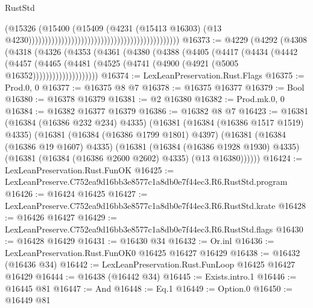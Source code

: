 \begin{lexlean}{RustStd}
\begin{coremodule}
                                                                                      (@15326
                                                                                        (@15400
                                                                                          (@15409
                                                                                            (@4231
                                                                                              (@15413
                                                                                                @16303)
                                                                                              (@13
                                                                                                @4230))))))))))))))))))))))))))))))))))))))))))))))
@16373 := @4229
    (@4292
      (@4308
        (@4318
          (@4326
            (@4353
              (@4361
                (@4380
                  (@4388
                    (@4405
                      (@4417
                        (@4434
                          (@4442
                            (@4457
                              (@4465
                                (@4481 (@4525 (@4741 (@4900 (@4921 (@5005 @16352))))))))))))))))))))
@16374 := LexLeanPreservation.Rust.Flags
@16375 := Prod.{0, 0}
@16377 := @16375 @8 @7
@16378 := @16375 @16377
@16379 := Bool
@16380 := @16378 @16379
@16381 := @2 @16380
@16382 := Prod.mk.{0, 0}
@16384 := @16382 @16377 @16379
@16386 := @16382 @8 @7
@16423 := @16381
    (@16384 (@16386 @232 @234) @4335)
    (@16381
      (@16384 (@16386 @1517 @1519) @4335)
      (@16381
        (@16384 (@16386 @1799 @1801) @4397)
        (@16381
          (@16384 (@16386 @19 @1607) @4335)
          (@16381
            (@16384 (@16386 @1928 @1930) @4335)
            (@16381 (@16384 (@16386 @2600 @2602) @4335) (@13 @16380))))))
@16424 := LexLeanPreservation.Rust.FunOK
@16425 := LexLeanPreserve.C752ea9d16bb3e8577c1a8db0e7f44ec3.R6.RustStd.program
@16426 := @16424 @16425
@16427 := LexLeanPreserve.C752ea9d16bb3e8577c1a8db0e7f44ec3.R6.RustStd.krate
@16428 := @16426 @16427
@16429 := LexLeanPreserve.C752ea9d16bb3e8577c1a8db0e7f44ec3.R6.RustStd.flags
@16430 := @16428 @16429
@16431 := @16430 @34
@16432 := Or.inl
@16436 := LexLeanPreservation.Rust.FunOK0 @16425 @16427 @16429
@16438 := @16432 (@16436 @34)
@16442 := LexLeanPreservation.Rust.FunLoop @16425 @16427 @16429
@16444 := @16438 (@16442 @34)
@16445 := Exists.intro.{1}
@16446 := @16445 @81
@16447 := And
@16448 := Eq.{1}
@16449 := Option.{0}
@16450 := @16449 @81

\end{coremodule}
\end{lexlean}
